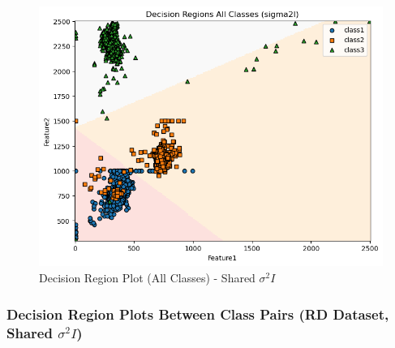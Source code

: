 \begin{figure}[H]
    \centering
    \includegraphics[width=0.85\linewidth]{images/RD_Group04_images/01_sigma2i/05_decision_region_all.png}
    \caption{Decision Region Plot (All Classes) - Shared $\sigma^2 I$}
\end{figure}

\subsubsection{Decision Region Plots Between Class Pairs (RD Dataset, Shared $\sigma^2 I$)}

